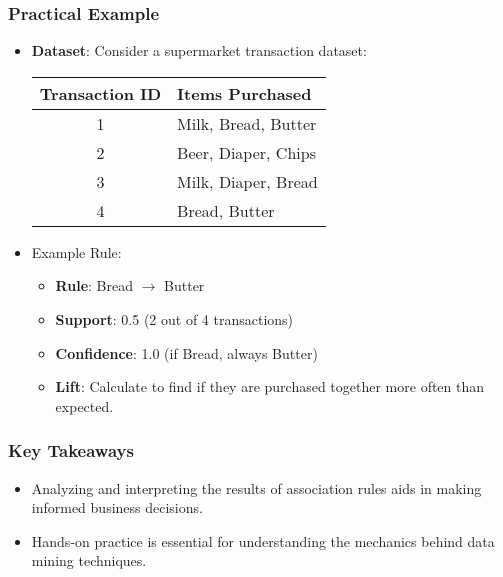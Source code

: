 \documentclass{beamer}
\begin{document}
\begin{frame}[fragile]
    \frametitle{Practical Example}
    \begin{itemize}
        \item \textbf{Dataset}: Consider a supermarket transaction dataset:
        \begin{table}[]
            \centering
            \begin{tabular}{|c|l|}
                \hline
                Transaction ID & Items Purchased             \\ \hline
                1              & Milk, Bread, Butter          \\ \hline
                2              & Beer, Diaper, Chips          \\ \hline
                3              & Milk, Diaper, Bread          \\ \hline
                4              & Bread, Butter                \\ \hline
            \end{tabular}
        \end{table}

        \item Example Rule:
        \begin{itemize}
            \item \textbf{Rule}: Bread $\rightarrow$ Butter
            \item \textbf{Support}: 0.5 (2 out of 4 transactions)
            \item \textbf{Confidence}: 1.0 (if Bread, always Butter)
            \item \textbf{Lift}: Calculate to find if they are purchased together more often than expected.
        \end{itemize}
    \end{itemize}
\end{frame}

\begin{frame}[fragile]
    \frametitle{Key Takeaways}
    \begin{itemize}
        \item Analyzing and interpreting the results of association rules aids in making informed business decisions.
        \item Hands-on practice is essential for understanding the mechanics behind data mining techniques.
    \end{itemize}
\end{frame}
\end{document}

